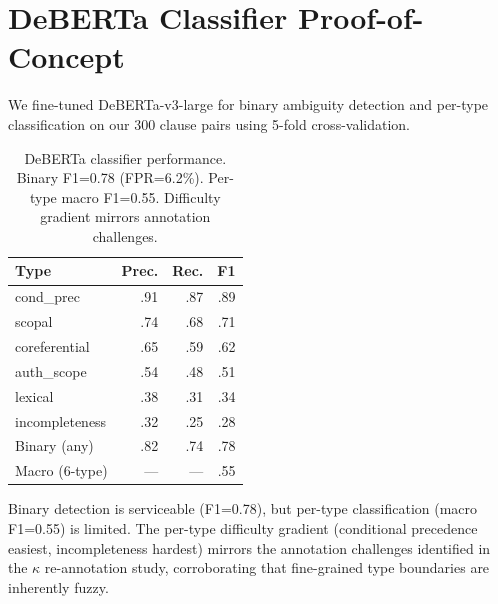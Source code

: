 \documentclass[11pt]{article}
\begin{document}
\section{DeBERTa Classifier Proof-of-Concept}
\label{sec:app_classifier}

We fine-tuned DeBERTa-v3-large for binary ambiguity detection and per-type classification on our 300 clause pairs using 5-fold cross-validation.

\begin{table}[h]
\centering
\small
\begin{tabular}{lrrr}
\toprule
\textbf{Type} & \textbf{Prec.} & \textbf{Rec.} & \textbf{F1} \\
\midrule
cond\_prec & .91 & .87 & .89 \\
scopal & .74 & .68 & .71 \\
coreferential & .65 & .59 & .62 \\
auth\_scope & .54 & .48 & .51 \\
lexical & .38 & .31 & .34 \\
incompleteness & .32 & .25 & .28 \\
\midrule
Binary (any) & .82 & .74 & .78 \\
Macro (6-type) & --- & --- & .55 \\
\bottomrule
\end{tabular}
\caption{DeBERTa classifier performance. Binary F1=0.78 (FPR=6.2\%). Per-type macro F1=0.55. Difficulty gradient mirrors annotation challenges.}
\label{tab:classifier}
\end{table}

Binary detection is serviceable (F1=0.78), but per-type classification (macro F1=0.55) is limited.
The per-type difficulty gradient (conditional precedence easiest, incompleteness hardest) mirrors the annotation challenges identified in the $\kappa$ re-annotation study, corroborating that fine-grained type boundaries are inherently fuzzy.
\end{document}
